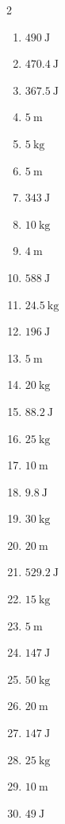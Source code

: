 \documentclass[12pt]{article}
\begin{document}
\begin{multicols}{2}
\begin{enumerate}[itemsep=1em]

\item \(\SI{490}{\joule}\)
\item \(\SI{470.4}{\joule}\)
\item \(\SI{367.5}{\joule}\)
\item \(\SI{5}{\metre}\)
\item \(\SI{5}{\kilogram}\)
\item \(\SI{5}{\metre}\)
\item \(\SI{343}{\joule}\)
\item \(\SI{10}{\kilogram}\)
\item \(\SI{4}{\metre}\)
\item \(\SI{588}{\joule}\)
\item \(\SI{24.5}{\kilogram}\)
\item \(\SI{196}{\joule}\)
\item \(\SI{5}{\metre}\)
\item \(\SI{20}{\kilogram}\)
\item \(\SI{88.2}{\joule}\)
\item \(\SI{25}{\kilogram}\)
\item \(\SI{10}{\metre}\)
\item \(\SI{9.8}{\joule}\)
\item \(\SI{30}{\kilogram}\)
\item \(\SI{20}{\metre}\)

\item \(\SI{529.2}{\joule}\)
\item \(\SI{15}{\kilogram}\)
\item \(\SI{5}{\metre}\)
\item \(\SI{147}{\joule}\)
\item \(\SI{50}{\kilogram}\)
\item \(\SI{20}{\metre}\)
\item \(\SI{147}{\joule}\)
\item \(\SI{25}{\kilogram}\)
\item \(\SI{10}{\metre}\)
\item \(\SI{49}{\joule}\)

\end{enumerate}
\end{multicols}
\end{document}
